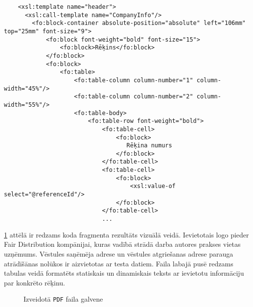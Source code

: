 {
\begin{verbatim}
    <xsl:template name="header">
      <xsl:call-template name="CompanyInfo"/>
        <fo:block-container absolute-position="absolute" left="106mm" top="25mm" font-size="9">
            <fo:block font-weight="bold" font-size="15">
                <fo:block>Rēķins</fo:block>
            </fo:block>
            <fo:block>
                <fo:table>
                    <fo:table-column column-number="1" column-width="45%"/>
                    <fo:table-column column-number="2" column-width="55%"/>
                    <fo:table-body>
                        <fo:table-row font-weight="bold">
                            <fo:table-cell>
                                <fo:block>
                                   Rēķina numurs
                                </fo:block>
                            </fo:table-cell>
                            <fo:table-cell>
                                <fo:block>
                                    <xsl:value-of select="@referenceId"/>
                                </fo:block>
                            </fo:table-cell>
                            ...
\end{verbatim}
}
\par \ref{orig:pdf} attēlā ir redzams koda fragmenta rezultāts vizuālā veidā. Ievietotais logo pieder Fair Distribution kompānijai, kuras vadībā strādā darba autores prakses vietas uzņēmums. Vēstules saņēmēja adrese un vēstules atgriešanas adrese parauga atrādīšānas nolūkos ir aizvietotas ar testa datiem. Faila labajā pusē redzams tabulas veidā formatēts statiskais un dinamiskais teksts ar ievietotu informāciju par konkrēto rēķinu.
\begin{figure}[H]
    \centering
    \caption{Izveidotā \texttt{PDF} faila galvene}
    \label{orig:pdf}
\end{figure}


